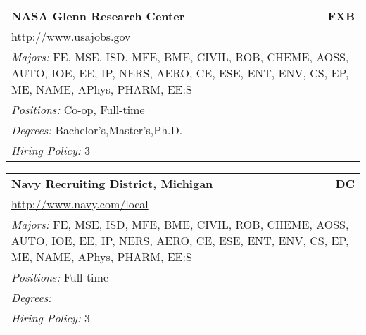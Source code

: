 \documentclass[twoside]{article}
\begin{document}
\begin{center}
\begin{multicols}{3}
\begin{FlushLeft}
\begin{minipage}{\columnwidth}
\end{minipage}
 
\begin{minipage}{\columnwidth}\begin{tabularx}{.95\columnwidth}{Xr}
                 {\Large\bf NASA Glenn Research Center} & {\Large\bf FXB}\\
    \multicolumn{2}{p{.95\columnwidth}}{\url{http://www.usajobs.gov}}\\
    \multicolumn{2}{p{.95\columnwidth}}{\emph{Majors:} FE, MSE, ISD, MFE, BME, CIVIL, ROB, CHEME, AOSS, AUTO, IOE, EE, IP, NERS, AERO, CE, ESE, ENT, ENV, CS, EP, ME, NAME, APhys, PHARM, EE:S}\\
    \multicolumn{2}{p{.95\columnwidth}}{\emph{Positions:} Co-op, Full-time}\\
    \multicolumn{2}{p{.95\columnwidth}}{\emph{Degrees:} Bachelor's,Master's,Ph.D.}\\
    \multicolumn{2}{p{.95\columnwidth}}{\emph{Hiring Policy:} 3}\\
    \end{tabularx}
    
\end{minipage}
 
\begin{minipage}{\columnwidth}\begin{tabularx}{.95\columnwidth}{Xr}
                 {\Large\bf Navy Recruiting District, Michigan} & {\Large\bf DC}\\
    \multicolumn{2}{p{.95\columnwidth}}{\url{http://www.navy.com/local}}\\
    \multicolumn{2}{p{.95\columnwidth}}{\emph{Majors:} FE, MSE, ISD, MFE, BME, CIVIL, ROB, CHEME, AOSS, AUTO, IOE, EE, IP, NERS, AERO, CE, ESE, ENT, ENV, CS, EP, ME, NAME, APhys, PHARM, EE:S}\\
    \multicolumn{2}{p{.95\columnwidth}}{\emph{Positions:} Full-time}\\
    \multicolumn{2}{p{.95\columnwidth}}{\emph{Degrees:} }\\
    \multicolumn{2}{p{.95\columnwidth}}{\emph{Hiring Policy:} 3}\\
    \end{tabularx}
    
\end{minipage}
 

\end{FlushLeft}
\end{multicols}
\end{center}
\end{document}
